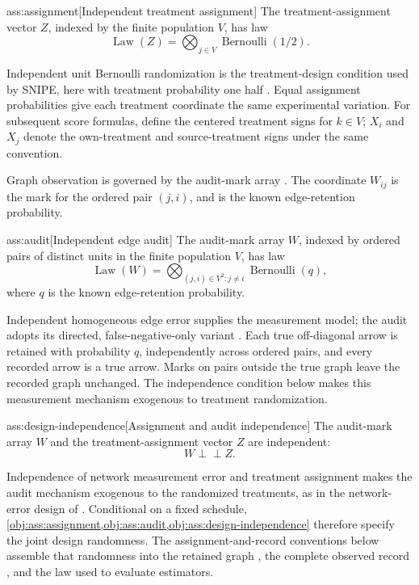 \documentclass[11pt]{article}
\begin{document}
\begin{assumptionv}{ass:assignment}[Independent treatment assignment]
The treatment-assignment vector \(Z\), indexed by the finite population \(V\), has law
\[
\operatorname{Law}(Z)
=
\bigotimes_{j\in V}\operatorname{Bernoulli}(1/2).
\]
\end{assumptionv}

Independent unit Bernoulli randomization is the treatment-design condition used by SNIPE, here with treatment probability one half \citep{CortezRodriguezEichhornYu2023SNIPE}. Equal assignment probabilities give each treatment coordinate the same experimental variation. For subsequent score formulas, define the centered treatment signs  for \(k\in V\); \(X_i\) and \(X_j\) denote the own-treatment and source-treatment signs under the same convention.

Graph observation is governed by the audit-mark array . The coordinate \(W_{ij}\) is the mark for the ordered pair \((j,i)\), and  is the known edge-retention probability.

\begin{assumptionv}{ass:audit}[Independent edge audit]
The audit-mark array \(W\), indexed by ordered pairs of distinct units in the finite population \(V\), has law
\[
\operatorname{Law}(W)
=
\bigotimes_{(j,i)\in V^2:j\ne i}\operatorname{Bernoulli}(q),
\]
where \(q\) is the known edge-retention probability.
\end{assumptionv}

Independent homogeneous edge error supplies the measurement model; the audit adopts its directed, false-negative-only variant \citep{LiSussmanKolaczyk2021NetworkNoise}. Each true off-diagonal arrow is retained with probability \(q\), independently across ordered pairs, and every recorded arrow is a true arrow. Marks on pairs outside the true graph leave the recorded graph unchanged. The independence condition below makes this measurement mechanism exogenous to treatment randomization.

\begin{assumptionv}{ass:design-independence}[Assignment and audit independence]
The audit-mark array \(W\) and the treatment-assignment vector \(Z\) are independent:
\[
W\mathbin{\perp\!\!\!\perp}Z.
\]
\end{assumptionv}

Independence of network measurement error and treatment assignment makes the audit mechanism exogenous to the randomized treatments, as in the network-error design of \citep{LiSussmanKolaczyk2021NetworkNoise}. Conditional on a fixed schedule, \cref{obj:ass:assignment,obj:ass:audit,obj:ass:design-independence} therefore specify the joint design randomness. The assignment-and-record conventions below assemble that randomness into the retained graph , the complete observed record , and the law used to evaluate estimators.
\end{document}

